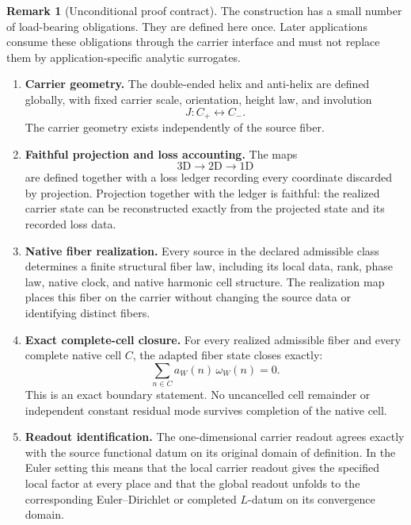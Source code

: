 \documentclass[11pt]{article}
\theoremstyle{definition}
\newtheorem{remark}[theorem]{Remark}
\begin{document}
\begin{remark}[Unconditional proof contract]\label{rem:proof-contract}
The construction has a small number of load-bearing obligations.  They are
defined here once.  Later applications consume these obligations through the
carrier interface and must not replace them by application-specific analytic
surrogates.

\begin{enumerate}
\item[\textup{(U1)}] \textbf{Carrier geometry.}
The double-ended helix and anti-helix are defined globally, with fixed carrier
scale, orientation, height law, and involution
\[
J:C_+\longleftrightarrow C_-.
\]
The carrier geometry exists independently of the source fiber.

\item[\textup{(U2)}] \textbf{Faithful projection and loss accounting.}
The maps
\[
3\mathrm D\longrightarrow2\mathrm D\longrightarrow1\mathrm D
\]
are defined together with a loss ledger recording every coordinate discarded
by projection.  Projection together with the ledger is faithful: the realized
carrier state can be reconstructed exactly from the projected state and its
recorded loss data.

\item[\textup{(U3)}] \textbf{Native fiber realization.}
Every source in the declared admissible class determines a finite structural
fiber law, including its local data, rank, phase law, native clock, and native
harmonic cell structure.  The realization map places this fiber on the carrier
without changing the source data or identifying distinct fibers.

\item[\textup{(U4)}] \textbf{Exact complete-cell closure.}
For every realized admissible fiber and every complete native cell \(C\), the
adapted fiber state closes exactly:
\[
\sum_{n\in C} a_W(n)\,\omega_W(n)=0.
\]
This is an exact boundary statement.  No uncancelled cell remainder or
independent constant residual mode survives completion of the native cell.

\item[\textup{(U5)}] \textbf{Readout identification.}
The one-dimensional carrier readout agrees exactly with the source functional
datum on its original domain of definition.  In the Euler setting this means
that the local carrier readout gives the specified local factor at every place
and that the global readout unfolds to the corresponding Euler--Dirichlet or
completed \(L\)-datum on its convergence domain.


\end{enumerate}
\end{remark}
\end{document}
